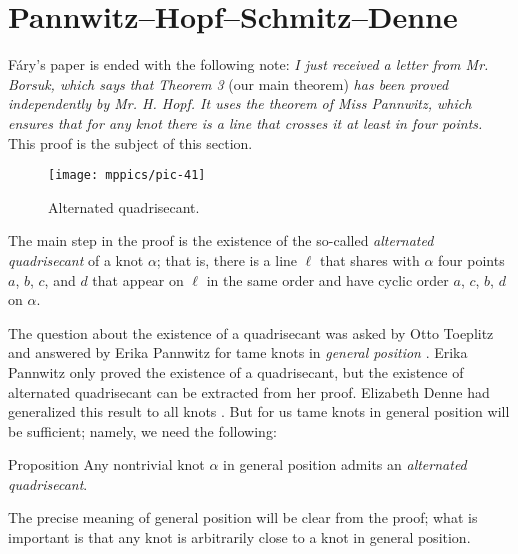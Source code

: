 \section{Pannwitz--Hopf--Schmitz--Denne}\label{sec:quadrisecant}

Fáry's paper \cite{fary} is ended with the following note:
\textit{I just received a letter from Mr. Borsuk, which says that Theorem 3} (our main theorem) \textit{has been proved independently by Mr. H. Hopf.
It uses the theorem of Miss Pannwitz, which ensures that for any knot there is a line that crosses it at least in four
points.}
This proof is the subject of this section.

{

\begin{wrapfigure}{r}{22 mm}
\vskip-0mm
\centering
\texttt{[image: mppics/pic-41]}
\caption*{Alternated quadrisecant.}
\vskip0mm
\end{wrapfigure}

The main step in the proof is the existence of the so-called \emph{alternated quadrisecant} of a knot $\alpha$; that is, there is a line $\ell$ that shares with $\alpha$ four points $a$, $b$, $c$, and $d$
that appear on $\ell$ in the same order and have cyclic order $a$, $c$, $b$, $d$ on $\alpha$.

The question about the existence of a quadrisecant was asked by Otto Toep\-litz and answered by Erika Pannwitz for tame knots in \emph{general position} \cite{pannwitz}.
Erika Pannwitz only proved the existence of a quadrisecant, but the existence of alternated quadrisecant can be extracted from her proof.
Elizabeth Denne had generalized this result to all knots \cite{denne, denne-survey}.
But for us tame knots in general position will be sufficient;
namely, we need the following:

}

\begin{thm}{Proposition}\label{prop:quadrisecant}
Any nontrivial knot $\alpha$ in general position admits an \emph{alternated quadrisecant}.
\end{thm}

The precise meaning of general position will be clear from the proof;
what is important is that any knot is arbitrarily close to a knot in general position.

